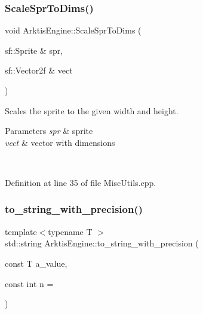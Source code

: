 \subsubsection{\texorpdfstring{ScaleSprToDims()}{ScaleSprToDims()}\hspace{0.1cm}{\footnotesize\ttfamily [2/2]}}
{\footnotesize\ttfamily void Arktis\+Engine\+::\+Scale\+Spr\+To\+Dims (\begin{DoxyParamCaption}\item[{sf\+::\+Sprite \&}]{spr,  }\item[{sf\+::\+Vector2f \&}]{vect }\end{DoxyParamCaption})}



Scales the sprite to the given width and height. 


\begin{DoxyParams}{Parameters}
{\em spr} & sprite\\
\hline
{\em vect} & vector with dimensions \begin{DoxyVerb}\end{DoxyVerb}
 \\
\hline
\end{DoxyParams}


Definition at line 35 of file Misc\+Utils.\+cpp.


\begin{DoxyCode}{0}

\end{DoxyCode}
\mbox{\label{namespace_arktis_engine_a94b44bcf5156b511b6510658261da5cc}} 
\subsubsection{\texorpdfstring{to\_string\_with\_precision()}{to\_string\_with\_precision()}}
{\footnotesize\ttfamily template$<$typename T $>$ \\
std\+::string Arktis\+Engine\+::to\+\_\+string\+\_\+with\+\_\+precision (\begin{DoxyParamCaption}\item[{const T}]{a\+\_\+value,  }\item[{const int}]{n = {} }\end{DoxyParamCaption})}



